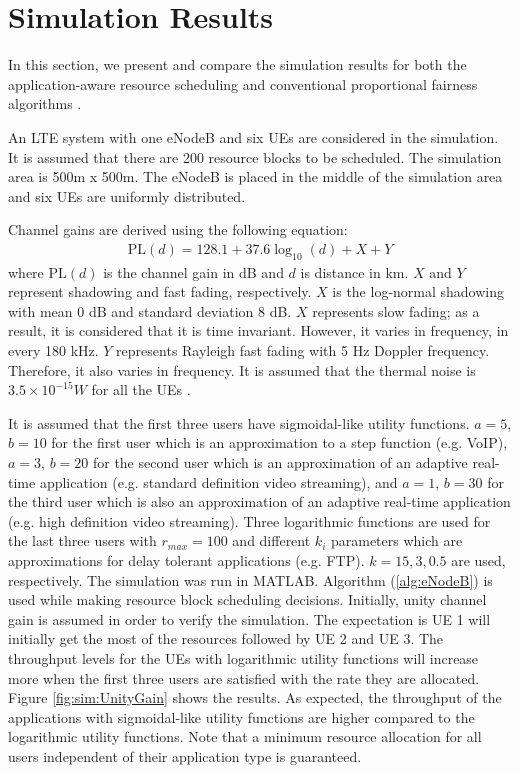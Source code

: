 \documentclass[journal]{IEEEtran} 				\IEEEoverridecommandlockouts 	\usepackage{amsmath,amssymb}
\begin{document}
\section{Simulation Results}\label{sec:sim}

In this section, we present and compare the simulation results for both the application-aware resource scheduling and conventional proportional fairness algorithms \cite{SelfOrganizedLTE}. 

An LTE system with one eNodeB and six UEs are considered in the simulation. It is assumed that there are 200 resource blocks to be scheduled. The simulation area is 500m x 500m. The eNodeB is placed in the middle of the simulation area and six UEs are uniformly distributed.


Channel gains are derived using the following equation:
\begin{equation}\label{eqn:ChGain}
\begin{aligned}
\text{PL}(d)=128.1+37.6\log_{10}(d)+X+Y 
\end{aligned}
\end{equation}
where $\text{PL}(d)$ is the channel gain in dB and $d$ is distance in km. $X$ and $Y$ represent shadowing and fast fading, respectively. $X$ is the log-normal shadowing with mean 0 dB and standard deviation 8 dB. $X$ represents slow fading; as a result, it is considered that it is time invariant. However, it varies in frequency, in every 180 kHz. $Y$ represents Rayleigh fast fading with 5 Hz Doppler frequency. Therefore, it also varies in frequency. It is assumed that the thermal noise is $3.5\times10^{-15} W$ for all the UEs \cite{SelfOrganizedLTE}.

It is assumed that the first three users have sigmoidal-like utility functions. $a=5$, $b=10$ for the first user which is an approximation to a step function (e.g. VoIP), $a=3$, $b=20$ for the second user which is an approximation of an adaptive real-time application (e.g. standard definition video streaming), and $a=1$, $b=30$ for the third user which is also an approximation of an adaptive real-time application (e.g. high definition video streaming). Three logarithmic functions are used for the last three users with $r_{max}=100$ and different $k_i$ parameters which are approximations for delay tolerant applications (e.g. FTP). $k={15, 3, 0.5}$ are used, respectively. The simulation was run in MATLAB. Algorithm (\ref{alg:eNodeB}) is used while making resource block scheduling decisions. Initially, unity channel gain is assumed in order to verify the simulation. The expectation is UE 1 will initially get the most of the resources followed by UE 2 and UE 3. The throughput levels for the UEs with logarithmic utility functions will increase more when the first three users are satisfied with the rate they are allocated. Figure \ref{fig:sim:UnityGain} shows the results. As expected, the throughput of the applications with sigmoidal-like utility functions are higher compared to the logarithmic utility functions. Note that a minimum
resource allocation for all users independent of their application type is guaranteed. 
\end{document}
